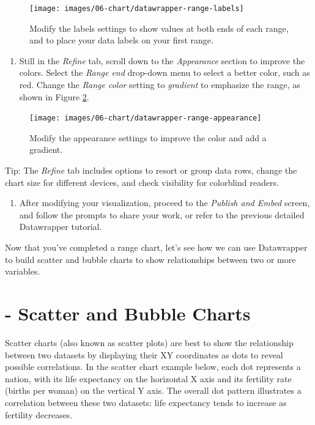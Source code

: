 \documentclass[
  english,
]{book}
\providecommand{\tightlist}{%
  \setlength{\itemsep}{0pt}\setlength{\parskip}{0pt}}
\begin{document}
\begin{figure}
\texttt{[image: images/06-chart/datawrapper-range-labels]} \caption{Modify the labels settings to show values at both ends of each range, and to place your data labels on your first range.}\label{fig:datawrapper-range-labels}
\end{figure}

\begin{enumerate}
\def\labelenumi{\arabic{enumi}.}
\setcounter{enumi}{7}
\tightlist
\item
  Still in the \emph{Refine} tab, scroll down to the \emph{Appearance} section to improve the colors. Select the \emph{Range end} drop-down menu to select a better color, such as red. Change the \emph{Range color} setting to \emph{gradient} to emphasize the range, as shown in Figure \ref{fig:datawrapper-range-appearance}.
\end{enumerate}



\begin{figure}
\texttt{[image: images/06-chart/datawrapper-range-appearance]} \caption{Modify the appearance settings to improve the color and add a gradient.}\label{fig:datawrapper-range-appearance}
\end{figure}

Tip: The \emph{Refine} tab includes options to resort or group data rows, change the chart size for different devices, and check visibility for colorblind readers.

\begin{enumerate}
\def\labelenumi{\arabic{enumi}.}
\setcounter{enumi}{8}
\tightlist
\item
  After modifying your visualization, proceed to the \emph{Publish and Embed} screen, and follow the prompts to share your work, or refer to the previous detailed Datawrapper tutorial.
\end{enumerate}

Now that you've completed a range chart, let's see how we can use Datawrapper to build scatter and bubble charts to show relationships between two or more variables.

\hypertarget{scatter-bubble-datawrapper}{%
\section*{- Scatter and Bubble Charts}\label{scatter-bubble-datawrapper}}

Scatter charts (also known as scatter plots) are best to show the relationship between two datasets by displaying their XY coordinates as dots to reveal possible correlations. In the scatter chart example below, each dot represents a nation, with its life expectancy on the horizontal X axis and its fertility rate (births per woman) on the vertical Y axis. The overall dot pattern illustrates a correlation between these two datasets: life expectancy tends to increase as fertility decreases.
\end{document}
